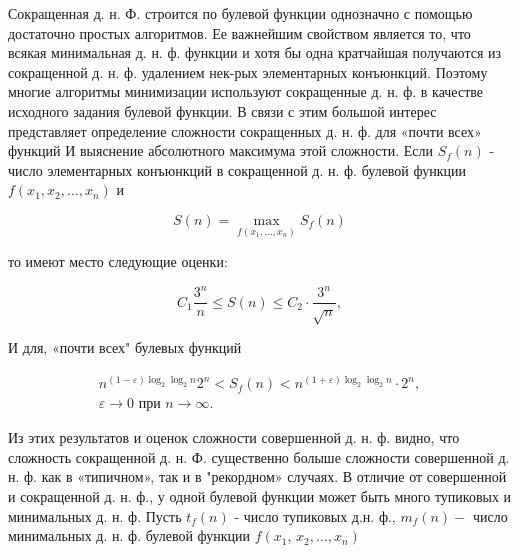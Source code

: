 \documentclass[10pt]{article}
\begin{document}
Сокращенная д. н. Ф. строится по булевой функции однозначно с помощью достаточно простых алгоритмов. Ее важнейшим свойством является то, что всякая минимальная д. н. ф. функции и хотя бы одна кратчайшая получаются из сокращенной д. н. ф. удалением нек-рых элементарных конъюнкций. Поэтому многие алгоритмы минимизации используют сокращенные д. н. ф. в качестве исходного задания булевой функции. В связи с этим большой интерес представляет определение сложности сокращенных д. н. ф. для «почти всех» функций И выяснение абсолютного максимума этой сложности. Если $S_{f}(n)$ - число элементарных конъюнкций в сокращенной д. н. ф. булевой функции $f\left(x_{1}, x_{2}, \ldots, x_{n}\right)$ и



\[

S(n)=\max _{f\left(x_{1}, \ldots, x_{n}\right)} S_{f}(n)

\]



то имеют место следующие оценки:



\[

C_{1} \frac{3^{n}}{n} \leqslant S(n) \leqslant C_{2} \cdot \frac{3^{n}}{\sqrt{n}},

\]



И для, «почти всех" булевых функций



\[

\begin{gathered}

n^{(1-\varepsilon) \log _{2} \log _{2} n} 2^{n}<S_{f}(n)<n^{(1+\varepsilon) \log _{2} \log _{2} n} \cdot 2^{n}, \\

\varepsilon \longrightarrow 0 \text { при } n \longrightarrow \infty .

\end{gathered}

\]



Из этих результатов и оценок сложности совершенной д. н. ф. видно, что сложность сокращенной д. н. Ф. существенно болыше сложности совершенной д. н. ф. как в «типичном», так и в "рекордном» случаях. В отличие от совершенной и сокращенной д. н. ф., у одной булевой функции может быть много тупиковых и минимальных д. н. ф. Пусть $t_{f}(n)$ - число тупиковых д.н. ф., $m_{f}(n)-$ число минимальных д. н. ф. булевой функции $f\left(x_{1}\right.$, $\left.x_{2}, \ldots, x_{n}\right)$
\end{document}
